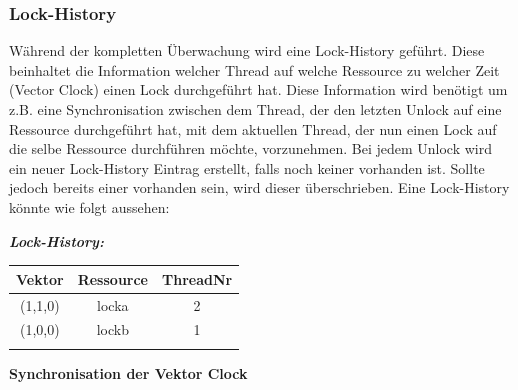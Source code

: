 \documentclass[10pt,a4paper]{article}
\begin{document}
\subsubsection{Lock-History}\label{lock_history}
\begin{flushleft}
Während der kompletten Überwachung wird eine Lock-History geführt. Diese beinhaltet die Information welcher Thread auf welche Ressource zu welcher Zeit (Vector Clock) einen Lock durchgeführt hat. Diese Information wird benötigt um z.B. eine Synchronisation zwischen dem Thread, der den letzten Unlock auf eine Ressource durchgeführt hat, mit dem aktuellen Thread, der nun einen Lock auf die selbe Ressource durchführen möchte, vorzunehmen. Bei jedem Unlock wird ein neuer Lock-History Eintrag erstellt, falls noch keiner vorhanden ist. Sollte jedoch bereits einer vorhanden sein, wird dieser überschrieben. Eine Lock-History könnte wie folgt aussehen:\\
\end{flushleft}
\begin{center}
\textbf{\textit{Lock-History:}}\\[0.5cm]
\begin{tabular}{ c c c }
  Vektor & Ressource & ThreadNr \\\hline
  (1,1,0) & locka & 2 \\
  (1,0,0) & lockb & 1 \\\hline\\
\end{tabular}
\end{center}
\textbf{Synchronisation der Vektor Clock}
\end{document}
